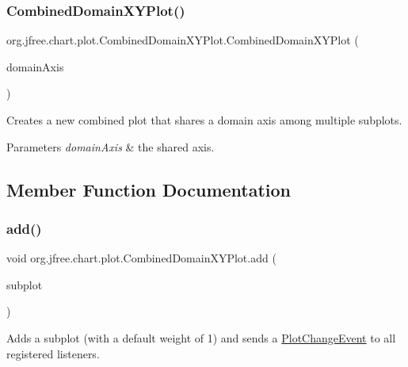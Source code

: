 \subsubsection{\texorpdfstring{Combined\+Domain\+X\+Y\+Plot()}{CombinedDomainXYPlot()}\hspace{0.1cm}{\footnotesize\ttfamily [2/2]}}
{\footnotesize\ttfamily org.\+jfree.\+chart.\+plot.\+Combined\+Domain\+X\+Y\+Plot.\+Combined\+Domain\+X\+Y\+Plot (\begin{DoxyParamCaption}\item[{\mbox{\hyperlink{classorg_1_1jfree_1_1chart_1_1axis_1_1_value_axis}{Value\+Axis}}}]{domain\+Axis }\end{DoxyParamCaption})}

Creates a new combined plot that shares a domain axis among multiple subplots.


\begin{DoxyParams}{Parameters}
{\em domain\+Axis} & the shared axis. \\
\hline
\end{DoxyParams}


\subsection{Member Function Documentation}
\mbox{\label{classorg_1_1jfree_1_1chart_1_1plot_1_1_combined_domain_x_y_plot_a5ee97545844c0a08b3687a9313c20023}} 
\subsubsection{\texorpdfstring{add()}{add()}\hspace{0.1cm}{\footnotesize\ttfamily [1/2]}}
{\footnotesize\ttfamily void org.\+jfree.\+chart.\+plot.\+Combined\+Domain\+X\+Y\+Plot.\+add (\begin{DoxyParamCaption}\item[{\mbox{\hyperlink{classorg_1_1jfree_1_1chart_1_1plot_1_1_x_y_plot}{X\+Y\+Plot}}}]{subplot }\end{DoxyParamCaption})}

Adds a subplot (with a default \textquotesingle{}weight\textquotesingle{} of 1) and sends a \mbox{\hyperlink{}{Plot\+Change\+Event}} to all registered listeners. 

